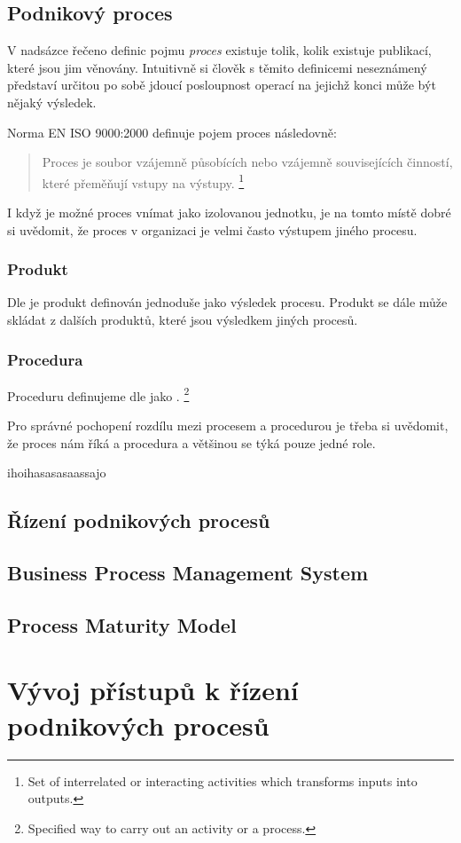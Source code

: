 \documentclass[]{article}
\begin{document}
\subsection{Podnikový proces}
V nadsázce řečeno definic pojmu \textit{proces} existuje tolik, kolik existuje publikací, které jsou jim věnovány. Intuitivně si člověk s těmito definicemi neseznámený představí určitou po sobě jdoucí posloupnost operací na jejichž konci může být nějaký výsledek.

Norma EN ISO 9000:2000 definuje pojem proces následovně:\cite{iso_9000}

\begin{quote}
Proces je soubor vzájemně působících nebo vzájemně souvisejících činností, které přeměňují vstupy na výstupy.
\footnote{Set of interrelated or interacting activities which transforms inputs into outputs.}
\end{quote}

I když je možné proces vnímat jako izolovanou jednotku, je na tomto místě dobré si uvědomit, že proces v organizaci je velmi často výstupem jiného procesu.

\subsubsection{Produkt}
Dle \cite{iso_9000} je produkt definován jednoduše jako výsledek procesu. Produkt se dále může skládat z dalších produktů, které jsou výsledkem jiných procesů.

\subsubsection{Procedura}
Proceduru definujeme dle \cite{iso_9000} jako \textit{}.
\footnote{Specified way to carry out an activity or a process.\cite{iso_9000}}

Pro správné pochopení rozdílu mezi procesem a procedurou je třeba si uvědomit, že proces nám říká  a procedura  a většinou se týká pouze jedné role.\cite{Bandor2007}

ihoihasasasaassa\cite{iso_9000}jo

\subsection{Řízení podnikových procesů}
\subsection{Business Process Management System}
\subsection{Process Maturity Model}

\section{Vývoj přístupů k řízení podnikových procesů}



\end{document}
